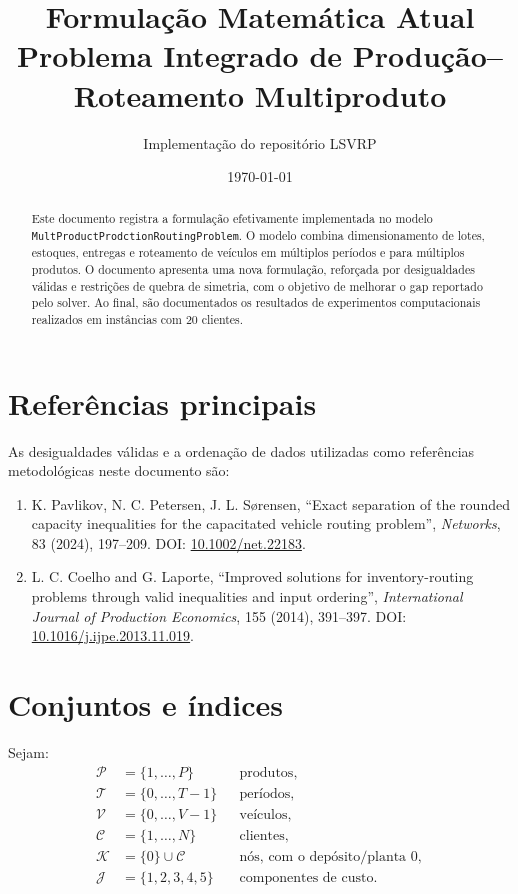 \documentclass[11pt,a4paper]{article}
\title{Formulação Matemática Atual\\
       Problema Integrado de Produção--Roteamento Multiproduto}
\author{Implementação do repositório LSVRP}
\date{\today}
\newcommand{\set}[1]{\mathcal{#1}}
\begin{document}
\maketitle

\begin{abstract}
\sloppy
Este documento registra a formulação efetivamente implementada no modelo
\texttt{MultProduct\allowbreak{}Prodction\allowbreak{}Routing\allowbreak{}Problem}. O modelo combina dimensionamento
de lotes, estoques, entregas e roteamento de veículos em múltiplos períodos e
para múltiplos produtos. O documento apresenta uma nova formulação, reforçada
por desigualdades válidas e restrições de quebra de simetria, com o objetivo de
melhorar o gap reportado pelo solver. Ao final, são documentados os resultados
de experimentos computacionais realizados em instâncias com 20 clientes.
\end{abstract}

\section*{Referências principais}

As desigualdades válidas e a ordenação de dados utilizadas como referências
metodológicas neste documento são:

\begin{enumerate}
  \item K. Pavlikov, N. C. Petersen, J. L. Sørensen, ``Exact separation of
  the rounded capacity inequalities for the capacitated vehicle routing
  problem'', \emph{Networks}, 83 (2024), 197--209.
  DOI: \href{https://doi.org/10.1002/net.22183}{10.1002/net.22183}.

  \item L. C. Coelho and G. Laporte, ``Improved solutions for
  inventory-routing problems through valid inequalities and input ordering'',
  \emph{International Journal of Production Economics}, 155 (2014),
  391--397.
  DOI: \href{https://doi.org/10.1016/j.ijpe.2013.11.019}{10.1016/j.ijpe.2013.11.019}.
\end{enumerate}

\tableofcontents

\section{Conjuntos e índices}

Sejam:
\begin{align*}
  \set{P} &= \{1,\ldots,P\} &&\text{produtos},\\
  \set{T} &= \{0,\ldots,T-1\} &&\text{períodos},\\
  \set{V} &= \{0,\ldots,V-1\} &&\text{veículos},\\
  \set{C} &= \{1,\ldots,N\} &&\text{clientes},\\
  \set{K} &= \{0\}\cup\set{C} &&\text{nós, com o depósito/planta }0,\\
  \set{J} &= \{1,2,3,4,5\} &&\text{componentes de custo}.
\end{align*}
\end{document}
